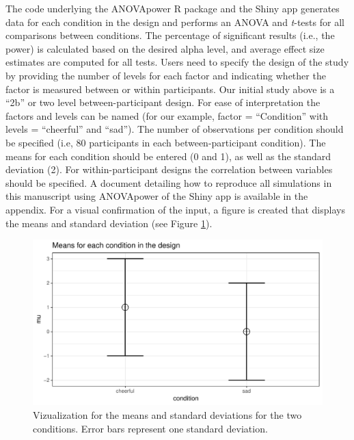 \documentclass[,jou,floatsintext]{apa6}
\begin{document}
The code underlying the ANOVApower R package and the Shiny app generates data for each condition in the design and performs an ANOVA and \emph{t}-tests for all comparisons between conditions.
The percentage of significant results (i.e., the power) is calculated based on the desired alpha level, and average effect size estimates are computed for all tests.
Users need to specify the design of the study by providing the number of levels for each factor and indicating whether the factor is measured between or within participants.
Our initial study above is a \enquote{2b} or two level between-participant design.
For ease of interpretation the factors and levels can be named (for our example, factor = \enquote{Condition} with levels = \enquote{cheerful} and \enquote{sad}).
The number of observations per condition should be specified (i.e, 80 participants in each between-participant condition).
The means for each condition should be entered (0 and 1), as well as the standard deviation (2).
For within-participant designs the correlation between variables should be specified.
A document detailing how to reproduce all simulations in this manuscript using ANOVApower of the Shiny app is available in the appendix.
For a visual confirmation of the input, a figure is created that displays the means and standard deviation (see Figure \ref{fig:mean-plot2}).

\begin{figure}
\centering
\includegraphics{0.1_Simulation_Based_Power_Analysis_For_Factorial_ANOVA_Designs_files/figure-latex/mean-plot2-1.pdf}
\caption{\label{fig:mean-plot2}Vizualization for the means and standard deviations for the two conditions. Error bars represent one standard deviation.}
\end{figure}
\end{document}
